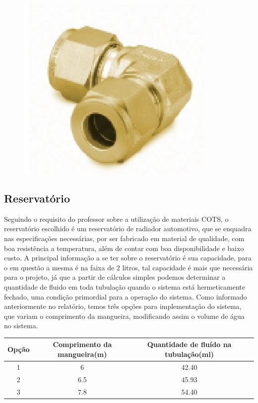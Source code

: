 \begin{figure}[!htb]                                                               
   \centering                                                                      
   \includegraphics[scale=0.6, keepaspectratio=true]{figuras/peca4.eps} 
\end{figure}

\subsection{Reservatório}

Seguindo o requisito do professor sobre a utilização de materiais COTS, o reservatório escolhido é um reservatório de radiador automotivo, que se enquadra nas especificações necessárias, por ser fabricado em material de qualidade, com boa resistência a temperatura, além de contar com boa disponibilidade e baixo custo. 
A principal informação a se ter sobre o reservatório é sua capacidade, para o em questão a mesma é na faixa de 2 litros, tal capacidade é mais que necessária para o projeto, já que a partir de cálculos simples podemos determinar a quantidade de fluido em toda tubulação quando o sistema está hermeticamente fechado, uma condição primordial para a operação do sistema. Como informado anteriormente no relatório, temos três opções para implementação do sistema, que variam o comprimento da mangueira, modificando assim o volume de água no sistema.

\begin{table}[!h]
\centering
\begin{tabular}{|c|c|c|c|}
\hline
Opção & Comprimento da mangueira(m) & Quantidade de fluído na tubulação(ml) \\
\hline
1 & 6 & 42.40 \\ \hline
2 & 6.5 & 45.93 \\ \hline
3 & 7.8 & 54.40 \\
\hline
\end{tabular}
\end{table}

